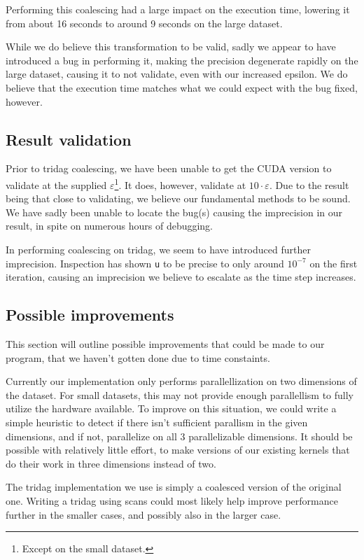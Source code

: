 \documentclass[a4paper]{article}
\begin{document}
Performing this coalescing had a large impact on the execution time, lowering
it from about 16 seconds to around 9 seconds on the large dataset.

While we do believe this transformation to be valid, sadly we appear to have
introduced a bug in performing it, making the precision degenerate rapidly
on the large dataset, causing it to not validate, even with our increased
epsilon. We do believe that the execution time matches what we could expect
with the bug fixed, however.

\subsection{Result validation}

Prior to tridag coalescing, we have been unable to get the CUDA version to
validate at the supplied $\varepsilon$\footnote{Except on the small dataset.}. It
does, however, validate at $10 \cdot \varepsilon$. Due to the result being that
close to validating, we believe our fundamental methods to be sound. We have
sadly been unable to locate the bug(s) causing the imprecision in our result,
in spite on numerous hours of debugging.

In performing coalescing on tridag, we seem to have introduced further
imprecision. Inspection has shown \texttt{u} to be precise to only around
$10^{-7}$ on the first iteration, causing an imprecision we believe to
escalate as the time step increases.

\subsection{Possible improvements}

This section will outline possible improvements that could be made to our
program, that we haven't gotten done due to time constaints.

Currently our implementation only performs parallellization on two dimensions
of the dataset. For small datasets, this may not provide enough parallellism
to fully utilize the hardware available. To improve on this situation, we
could write a simple heuristic to detect if there isn't sufficient parallism
in the given dimensions, and if not, parallelize on all 3 parallelizable
dimensions. It should be possible with relatively little effort, to make
versions of our existing kernels that do their work in three dimensions
instead of two.

The tridag implementation we use is simply a coalesced version of the original
one. Writing a tridag using scans could most likely help improve performance
further in the smaller cases, and possibly also in the larger case.
\end{document}
